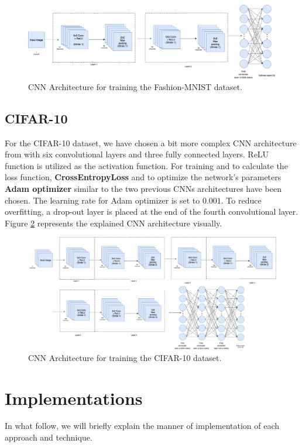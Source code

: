 \begin{figure}
  \centering
  \label{fig:Fashion_MNIST_CNN_Architecture}
  \includegraphics[width=1\textwidth]{fig/Fashion-MNIST-CNN-Architecture}
  \caption{CNN Architecture for training the Fashion-MNIST dataset.}
\end{figure}

\subsection{CIFAR-10}
For the CIFAR-10 dataset, we have chosen a bit more complex CNN architecture from
\cite{CIFAR_CNN_Architecture} with six
convolutional layers and three fully connected layers. ReLU function is utilized as the activation
function. For training and to calculate the loss function, \textbf{CrossEntropyLoss} and
to optimize the network's parameters \textbf{Adam optimizer} similar to the two previous CNNs architectures have been
chosen. The learning rate for Adam optimizer is set to $0.001$. To reduce overfitting, a
drop-out layer is placed at the end of the fourth convolutional layer. Figure \ref{fig:CIFAR_CNN_Architecture} represents the explained CNN architecture visually.


\begin{figure}
  \centering
  \label{fig:CIFAR_CNN_Architecture}
  \includegraphics[width=1\textwidth]{fig/CIFAR-CNN-Architecture}
  \caption{CNN Architecture for training the CIFAR-10 dataset.}
\end{figure}

\section{Implementations}
In what follow, we will briefly explain the manner of implementation of each
approach and technique.

